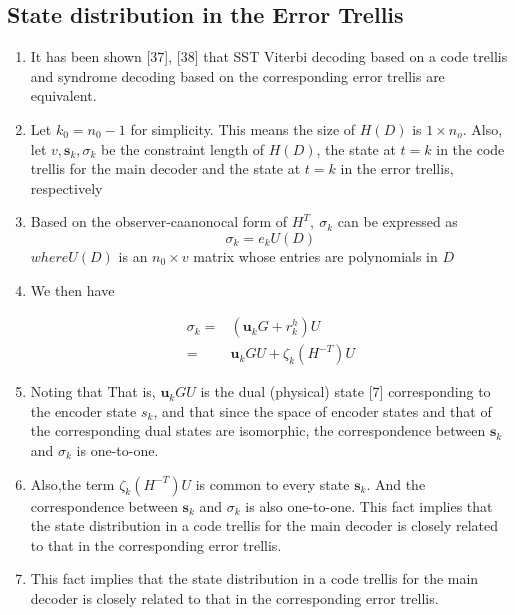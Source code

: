 \documentclass[fontsize=12pt]{article}
\theoremstyle{definition}
\begin{document}
\subsection{State distribution in the Error Trellis}
\begin{enumerate}
\item It has been shown [37], [38] that SST Viterbi decoding
based on a code trellis and syndrome decoding based on the
corresponding error trellis are equivalent.

\item Let $k_0=n_0-1$ for simplicity. This means the size of $H(D)$ is $1 \times n_o$. Also, let $v,\mathbf{s}_k,\sigma_k$ be the constraint length of $H(D)$, the state at $t = k$ in the code trellis for the main
decoder and the state at $t = k$ in the error trellis, respectively

\item Based on the observer-caanonocal form of $H^T,~\sigma_k$ can be expressed as 
\begin{equation}
\sigma_k = e_kU(D)
\end{equation}
$where U(D)$ is an $n_0 \times v$ matrix whose entries are polynomials in $D$

\item We then have 

\begin{equation}
\begin{aligned}
\sigma_k =&(\mathbf{u}_kG + r_k^h)U \\
=&\mathbf{u}_kGU + \zeta_k(H^{-T})U
\end{aligned}
\end{equation}
\item Noting that That is, $\mathbf{u}_kGU $ is the
dual (physical) state [7] corresponding to the encoder state $s_k$, and that
since the space of encoder states and that of the corresponding
dual states are isomorphic, the correspondence between $\mathbf{s}_k$ and $\sigma_k$ is one-to-one.

\item Also,the term $ \zeta_k(H^{-T})U$ is
common to every state $\mathbf{s}_k$. And the correspondence between
 $\mathbf{s}_k$ and $\sigma_k$ is also one-to-one. This fact implies that the state
distribution in a code trellis for the main decoder is closely
related to that in the corresponding error trellis. 

\item This fact implies that the state
distribution in a code trellis for the main decoder is closely
related to that in the corresponding error trellis.
\end{enumerate}
\end{document}
